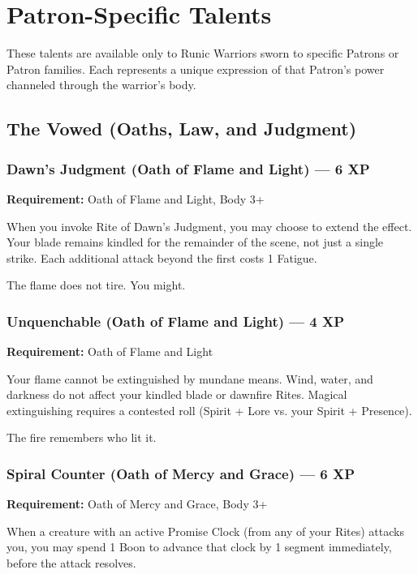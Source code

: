 \section{Patron-Specific Talents}

These talents are available only to Runic Warriors sworn to specific Patrons or Patron families. Each represents a unique expression of that Patron's power channeled through the warrior's body.

\subsection{The Vowed (Oaths, Law, and Judgment)}

\subsubsection{Dawn's Judgment (Oath of Flame and Light) — 6 XP}

\textbf{Requirement:} Oath of Flame and Light, Body 3+

When you invoke Rite of Dawn's Judgment, you may choose to extend the effect. Your blade remains kindled for the remainder of the scene, not just a single strike. Each additional attack beyond the first costs 1 Fatigue.

The flame does not tire. You might.

\subsubsection{Unquenchable (Oath of Flame and Light) — 4 XP}

\textbf{Requirement:} Oath of Flame and Light

Your flame cannot be extinguished by mundane means. Wind, water, and darkness do not affect your kindled blade or dawnfire Rites. Magical extinguishing requires a contested roll (Spirit + Lore vs. your Spirit + Presence).

The fire remembers who lit it.

\subsubsection{Spiral Counter (Oath of Mercy and Grace) — 6 XP}

\textbf{Requirement:} Oath of Mercy and Grace, Body 3+

When a creature with an active Promise Clock (from any of your Rites) attacks you, you may spend 1 Boon to advance that clock by 1 segment immediately, before the attack resolves.

